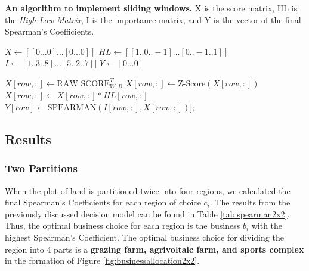 \documentclass{mcmthesis}
\begin{document}
\begin{algorithm}[!htbp]
\caption{\textbf{An algorithm to implement sliding windows.} X is the score matrix, HL is the \textit{High-Low Matrix}, I is the importance matrix, and Y is the vector of the final Spearman's Coefficients.}
\label{alg:slidingwindows}

$X \gets [[0...0]...[0...0]]$\;
$HL \gets [[1..0..-1]...[0..-1..1]]$\;
$I \gets [1..3..8]...[5..2..7]]$\;
$Y \gets [0...0]$\;
 {
     {
         {
        
            $X[row, :] \gets \text{RAW SCORE}_{W, B}^T$\;
            $X[row, :] \gets \text{Z-Score}(X[row, :])$\;
            $X[row, :] \gets X[row, :] * HL[row, :]$\;
            $Y[row] \gets \text{SPEARMAN}(I[row, :], X[row, :])$];
            
        }
    }
}

\end{algorithm}

\subsection{Results}

\subsubsection{Two Partitions}

When the plot of land is partitioned twice into four regions, we calculated the final Spearman's Coefficients for each region of choice $c_i$. The results from the previously discussed decision model can be found in Table \ref{tab:spearman2x2}. Thus, the optimal business choice for each region is the business $b_i$ with the highest Spearman's Coefficient. The optimal business choice for dividing the region into 4 parts is a \textbf{grazing farm, agrivoltaic farm, and sports complex} in the formation of Figure \ref{fig:businessallocation2x2}.
\end{document}
